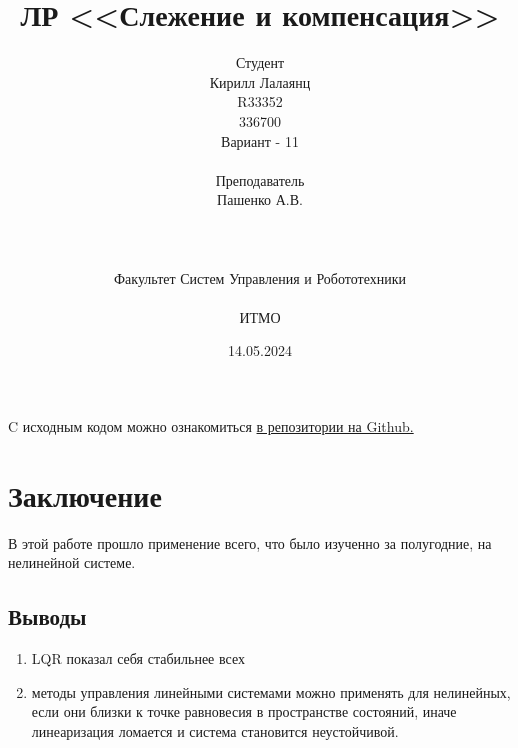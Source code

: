 \documentclass[16pt]{article}
\title{ЛР \textnumero 12 <<Слежение и компенсация>>}
\author{
Студент \\
Кирилл Лалаянц\\
R33352\\
336700\\
Вариант - 11\\
\\
Преподаватель\\
Пашенко А.В. \\
\\
\\
\\
Факультет Систем Управления и Робототехники\\
\\
ИТМО\\
}
\date{14.05.2024}
\begin{document}
\maketitle
\newpage
\tableofcontents
\thispagestyle{empty}

\newpage
\setcounter{page}{1}
C исходным кодом можно ознакомиться \href{https://github.com/lalayants/control-theory-itmo-2023-2024}{в репозитории на Github.}


\newpage

\FloatBarrier

\newpage

\FloatBarrier

\newpage

\FloatBarrier

\newpage

\FloatBarrier

\newpage

\FloatBarrier

\newpage
\newpage
\section{Заключение}
В этой работе прошло применение всего, что было изученно за полугодние, на нелинейной системе.
\subsection{Выводы}
\begin{enumerate}
   \item LQR показал себя стабильнее всех 
   \item методы управления линейными системами можно применять для нелинейных, если они близки к точке равновесия в пространстве состояний, иначе линеаризация ломается и система становится неустойчивой.
\end{enumerate}
\end{document}
